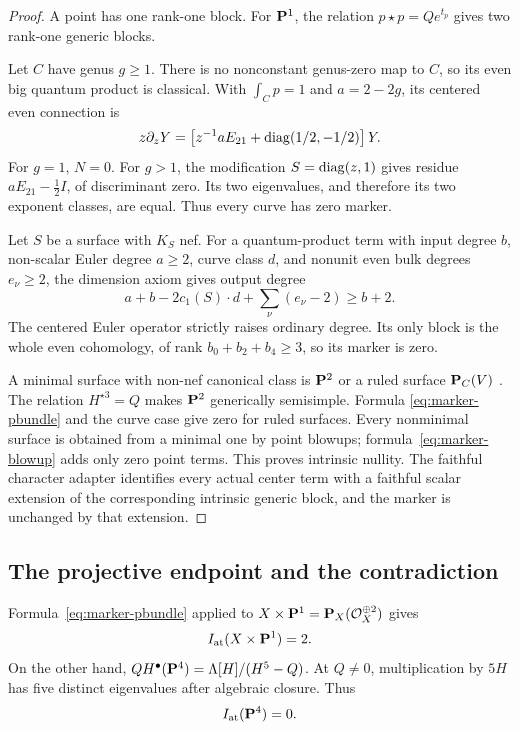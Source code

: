 \begin{proof}
A point has one rank-one block.  For \(\mathbf P^1\), the relation
\(p\star p=Qe^{t_p}\) gives two rank-one generic blocks.

Let \(C\) have genus \(g\ge1\).  There is no nonconstant genus-zero map to
\(C\), so its even big quantum product is classical.  With
\(\int_Cp=1\) and \(a=2-2g\), its centered even connection is
\[
 z\partial_zY=
 \left[z^{-1}aE_{21}+\operatorname{diag}(1/2,-1/2)\right]Y.
\]
For \(g=1\), \(N=0\).  For \(g>1\), the modification
\(S=\operatorname{diag}(z,1)\) gives residue \(aE_{21}-\tfrac12I\), of discriminant zero.
Its two eigenvalues, and therefore its two exponent classes, are equal.  Thus
every curve has zero marker.

Let \(S\) be a surface with \(K_S\) nef.  For a quantum-product term with
input degree \(b\), non-scalar Euler degree \(a\ge2\), curve class \(d\), and
nonunit even bulk degrees \(e_\nu\ge2\), the dimension axiom gives output
degree
\[
 a+b-2c_1(S)\cdot d+\sum_\nu(e_\nu-2)\ge b+2.
\]
The centered Euler operator strictly raises ordinary degree.  Its only block
is the whole even cohomology, of rank \(b_0+b_2+b_4\ge3\), so its marker is
zero.

A minimal surface with non-nef canonical class is \(\mathbf P^2\) or a ruled
surface \(\mathbf P_C(V)\) \cite[Chapter~VI]{BeauvilleSurfaces}.  The relation
\(H^{\star3}=Q\) makes \(\mathbf P^2\) generically semisimple.  Formula
\eqref{eq:marker-pbundle} and the curve case give zero for ruled surfaces.
Every nonminimal surface is obtained from a minimal one by point blowups;
formula~\eqref{eq:marker-blowup} adds only zero point terms.  This proves
intrinsic nullity.  The faithful character adapter identifies every actual
center term with a faithful scalar extension of the corresponding intrinsic
generic block, and the marker is unchanged by that extension.
\end{proof}

\subsection{The projective endpoint and the contradiction}

Formula~\eqref{eq:marker-pbundle} applied to
\(X\times\mathbf P^1=\mathbf P_X(\mathcal O_X^{\oplus2})\) gives
\begin{equation}
 I_{\mathrm{at}}(X\times\mathbf P^1)=2.
 \label{eq:atomic-product-value}
\end{equation}
On the other hand,
\(QH^\bullet(\mathbf P^4)=\Lambda[H]/(H^5-Q)\).  At \(Q\ne0\), multiplication
by \(5H\) has five distinct eigenvalues after algebraic closure.  Thus
\begin{equation}
 I_{\mathrm{at}}(\mathbf P^4)=0.
 \label{eq:atomic-projective-value}
\end{equation}

